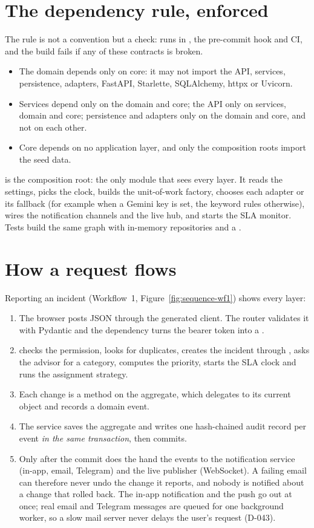 \section{The dependency rule, enforced}
The rule is not a convention but a check:  runs in , the
pre-commit hook and CI, and the build fails if any of these contracts is broken.
\begin{itemize}
  \item The domain depends only on core: it may not import the API, services, persistence,
    adapters, FastAPI, Starlette, SQLAlchemy, httpx or Uvicorn.
  \item Services depend only on the domain and core; the API only on services, domain and
    core; persistence and adapters only on the domain and core, and not on each other.
  \item Core depends on no application layer, and only the composition roots import the seed
    data.
\end{itemize}
 is the composition root: the only module that sees every layer. It reads the
settings, picks the clock, builds the unit-of-work factory, chooses each adapter or its
fallback (for example  when a Gemini key is set, the
keyword rules otherwise), wires the notification channels and the live hub, and starts the SLA
monitor. Tests build the same graph with in-memory repositories and a .

\section{How a request flows}
Reporting an incident (Workflow~1, Figure~\ref{fig:sequence-wf1}) shows every layer:
\begin{enumerate}
  \item The browser posts JSON through the generated client. The router validates it with
    Pydantic and the  dependency turns the bearer token into a .
  \item {} checks the permission, looks for duplicates, creates the
    incident through , asks the advisor for a category, computes the
    priority, starts the SLA clock and runs the assignment strategy.
  \item Each change is a method on the  aggregate, which delegates to its
    current  object and records a domain event.
  \item The service saves the aggregate and writes one hash-chained audit record per event
    \emph{in the same transaction}, then commits.
  \item Only after the commit does the  hand the events to the
    notification service (in-app, email, Telegram) and the live publisher (WebSocket). A
    failing email can therefore never undo the change it reports, and nobody is notified about
    a change that rolled back. The in-app notification and the push go out at once; real email
    and Telegram messages are queued for one background worker, so a slow mail server never
    delays the user's request (D-043).
\end{enumerate}

